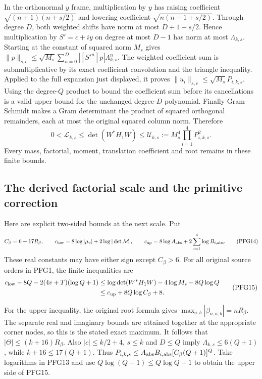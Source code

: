 \documentclass[10pt]{article}
\begin{document}
In the orthonormal $y$ frame, multiplication by $y$ has raising
coefficient $\sqrt{(n+1)(n+s/2)}$ and lowering coefficient
$\sqrt{n(n-1+s/2)}$. Through degree $D$, both weighted shifts
have norm at most $D+1+s/2$. Hence multiplication by $S'=c+iy$
on degree at most $D-1$ has norm at most $\Lambda_{k,s}$.
Starting at the constant of squared norm $M_s$ gives
$\|p\|_{s,c}\le\sqrt{M_s}\sum_{n=0}^D|[S'^n]p|\Lambda_{k,s}^n$.
The weighted coefficient sum is submultiplicative by its exact
coefficient convolution and the triangle inequality. Applied to
the full expansion just displayed, it proves
$\|u_i\|_{s,c}\le\sqrt{M_s}P_{i,k,s}$. Using the degree-$Q$
product to bound the coefficient sum before its cancellations is
a valid upper bound for the unchanged degree-$D$ polynomial.
Finally Gram--Schmidt makes a Gram determinant the product of
squared orthogonal remainders, each at most the original squared
column norm. Therefore
\[
 \boxed{\quad
 0<\mathcal L_{k,s}\le\det(W^*H_1W)
       \le \mathcal U_{k,s}:=M_s^4\prod_{i=1}^4P_{i,k,s}^2 .
 \quad}\tag{PFG13}
\]
Every mass, factorial, moment, translation coefficient and root remains
in these finite bounds.

\subsection{The derived factorial scale and the primitive correction}

Here are explicit two-sided bounds at the next scale. Put
\[
 C_\beta=6+17R_\beta,\qquad
 c_{\rm low}=8\log|\mu_v|+2\log|\det\mathcal M|,\qquad
 c_{\rm up}=8\log A_{\rm abs}
                   +2\sum_{i=1}^4\log B_{i,\rm abs}.
 \tag{PFG14}
\]
These real constants may have either sign except $C_\beta>6$.
For all original source orders in PFG1, the finite inequalities are
\[
\begin{split}
 c_{\rm low}-8Q-2(4v+T)(\log Q+1)
 &\le \log\det(W^*H_1W)-4\log M_s-8Q\log Q\\
 &\le c_{\rm up}+8Q\log C_\beta+8 .
\end{split}\tag{PFG15}
\]

For the upper inequality, the original root formula gives
$\max_{a,b}|\beta_{n,a,b}|=nR_\beta$.
The separate real and imaginary bounds are attained together at
the appropriate corner nodes, so this is the stated exact maximum.
It follows that $|\Theta|\le(k+16)R_\beta$.
Also $|c|\le k/2+4$, $s\le k$ and $D\le Q$ imply
$\Lambda_{k,s}\le6(Q+1)$, while $k+16\le17(Q+1)$.
Thus
$P_{i,k,s}\le A_{\rm abs}B_{i,\rm abs}[C_\beta(Q+1)]^Q$.
Take logarithms in PFG13 and use
$Q\log(Q+1)\le Q\log Q+1$ to obtain the upper side of PFG15.
\end{document}
